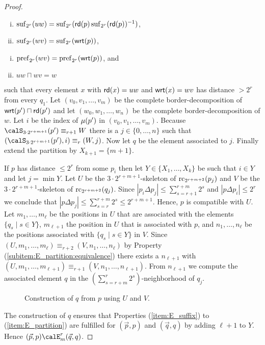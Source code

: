 \begin{proof}
	\begin{minipage}{0.54\linewidth}
	\begin{enumerate}[(i)]
		\item $\operatorname{suf}_{2^{r}}(uw) = \operatorname{suf}_{2^{r}}(\mathsf{rd}(p)\operatorname{suf}_{2^{r}}(\mathsf{rd}(p))^{-1} )$,
		\item $\operatorname{suf}_{2^{r}}(wv) = \operatorname{suf}_{2^{r}}(\mathsf{wrt}(p))$,
	\end{enumerate}
    \end{minipage}
    \begin{minipage}{0.44\linewidth}
    	\begin{enumerate}[(i)]
    		\addtocounter{enumi}{2}
    		\item $\operatorname{pref}_{2^{r}}(wv) = \operatorname{pref}_{2^{r}}(\mathsf{wrt}(p))$, and
    		\item $uw\sqcap wv = w$
    	\end{enumerate}
    \end{minipage}
    such that every element $x$ with $\mathsf{rd}(x) = uw$ and $\mathsf{wrt}(x) = wv$ has distance $> 2^r$ from every $q_1$.
	Let $(v_0,v_1,\ldots, v_m)$ be the complete border-decomposition of $\mathsf{wrt}(p')\sqcap \mathsf{rd}(p')$ and let $(w_0, w_1,\ldots, w_n)$ be the complete border-decomposition of $w$. Let $i$
	be the index of $\mu(p')$ in $(v_0,v_1,\ldots, v_m)$. Because $\calS_{3\cdot 2^{r+m+1}}(p') \equiv_{r+1} W$ there is a $j\in \{0,\ldots,n\}$ such that $(\calS_{3\cdot 2^{r+m+1}}(p'), i) \equiv_r (W,j)$.
	Now let $q$ be the element associated to $j$. Finally extend the partition by $X_{k+1} = \{m+1\}$.
	
	
	If $p$ has distance $\leq 2^{r}$ from some $p_i$ then let $Y\in \{X_1,\ldots,X_k\}$ be such that $i\in Y$ and let $j=\min Y$. Let $U$ be the $3\cdot 2^{r+m+1}$-skeleton of $\operatorname{rc}_{2^{r+m+2}}(p_j)$ and 
	$V$ be the $3\cdot 2^{r+m+1}$-skeleton of $\operatorname{rc}_{2^{r+m+2}}(q_j)$.
	Since $|p_i\Delta p_j| \leq \sum_{s=r+1}^{r+m} 2^s$ and $|p\Delta p_i| \leq 2^r$ we conclude that $|p\Delta p_j| \leq \sum_{s=r}^{r+m} 2^s \leq 2^{r+m+1}$. Hence, $p$ is compatible with $U$. Let $m_1,\ldots,m_\ell$ be the positions in $U$ that are associated with the elements $\{q_s \mid s\in Y\}$, $m_{\ell+1}$ the position in $U$ that is associated with $p$, and $n_1,\ldots,n_\ell$ be the positions associated with $\{q_s \mid s\in Y\}$ in $V$. Since $(U,m_1,\ldots,m_\ell) \equiv_{r+2} (V,n_1,\ldots,n_\ell)$ by Property (\ref{subitem:E_partition:equivalence}) there exists a $n_{\ell+1}$ with $(U,m_1,\ldots,m_{\ell+1}) \equiv_{r+1} (V,n_1,\ldots,n_{\ell+1})$. From $n_{\ell+1}$ we compute the associated element $q$
	in the $(\sum_{s= r+m}^{r} 2^s)$-neighborhood of $q_j$.
	\begin{figure}[h]
		\centering
		\caption{\label{fig:construction}Construction of $q$ from $p$ using $U$ and $V$.}
	\end{figure}
	The construction of $q$ ensures that Properties (\ref{item:E_suffix}) to (\ref{item:E_partition}) are fulfilled for $(\vec{p}, p)$ and $(\vec{q}, q)$ by adding $\ell+1$ to $Y$. Hence $(\vec{p}, p) \calE^r_m (\vec{q}, q)$.
\end{proof}


